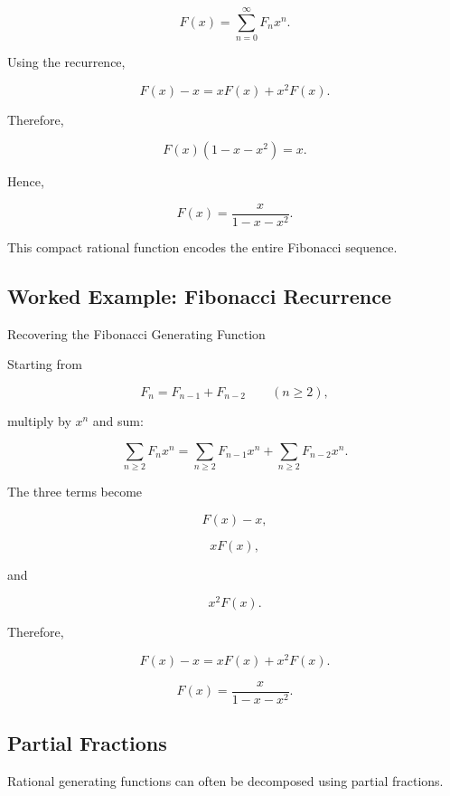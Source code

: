 \[
F(x)
=
\sum_{n=0}^{\infty}F_nx^n.
\]

Using the recurrence,

\[
F(x)-x
=
xF(x)+x^2F(x).
\]

Therefore,

\[
F(x)(1-x-x^2)=x.
\]

Hence,

\[
\boxed{
F(x)
=
\frac{x}{1-x-x^2}.
}
\]

This compact rational function encodes the entire Fibonacci sequence.

\subsection{Worked Example: Fibonacci Recurrence}
\label{subsec:worked-fibonacci-gf}

\begin{workedexamplebox}{Recovering the Fibonacci Generating Function}

Starting from

\[
F_n=F_{n-1}+F_{n-2}
\qquad(n\geq2),
\]

multiply by \(x^n\) and sum:

\[
\sum_{n\geq2}F_nx^n
=
\sum_{n\geq2}F_{n-1}x^n
+
\sum_{n\geq2}F_{n-2}x^n.
\]

The three terms become

\[
F(x)-x,
\]

\[
xF(x),
\]

and

\[
x^2F(x).
\]

Therefore,

\[
F(x)-x
=
xF(x)+x^2F(x).
\]

\begin{answerbox}
\[
\boxed{
F(x)=\frac{x}{1-x-x^2}.
}
\]
\end{answerbox}

\end{workedexamplebox}

\subsection{Partial Fractions}
\label{subsec:partial-fractions-gf}

Rational generating functions can often be decomposed using partial
fractions.

